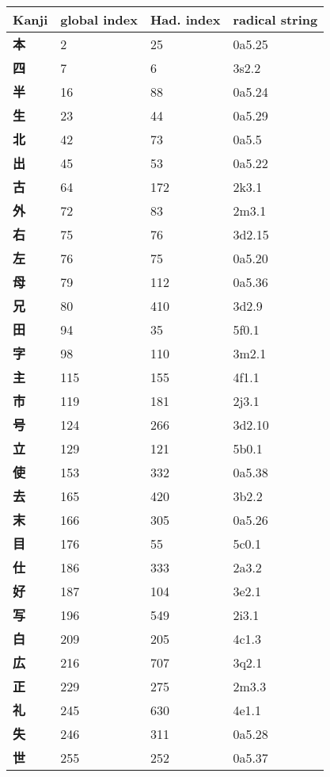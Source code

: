   \begin{longtable}[c]{llll}
    \bfseries Kanji & \bfseries global index & \bfseries Had. index & \bfseries radical string\\\hline\endhead
    \bfseries 本 & 2 & 25 & 0a5.25\\
    \bfseries 四 & 7 & 6 & 3s2.2\\
    \bfseries 半 & 16 & 88 & 0a5.24\\
    \bfseries 生 & 23 & 44 & 0a5.29\\
    \bfseries 北 & 42 & 73 & 0a5.5\\
    \bfseries 出 & 45 & 53 & 0a5.22\\
    \bfseries 古 & 64 & 172 & 2k3.1\\
    \bfseries 外 & 72 & 83 & 2m3.1\\
    \bfseries 右 & 75 & 76 & 3d2.15\\
    \bfseries 左 & 76 & 75 & 0a5.20\\
    \bfseries 母 & 79 & 112 & 0a5.36\\
    \bfseries 兄 & 80 & 410 & 3d2.9\\
    \bfseries 田 & 94 & 35 & 5f0.1\\
    \bfseries 字 & 98 & 110 & 3m2.1\\
    \bfseries 主 & 115 & 155 & 4f1.1\\
    \bfseries 市 & 119 & 181 & 2j3.1\\
    \bfseries 号 & 124 & 266 & 3d2.10\\
    \bfseries 立 & 129 & 121 & 5b0.1\\
    \bfseries 使 & 153 & 332 & 0a5.38\\
    \bfseries 去 & 165 & 420 & 3b2.2\\
    \bfseries 末 & 166 & 305 & 0a5.26\\
    \bfseries 目 & 176 & 55 & 5c0.1\\
    \bfseries 仕 & 186 & 333 & 2a3.2\\
    \bfseries 好 & 187 & 104 & 3e2.1\\
    \bfseries 写 & 196 & 549 & 2i3.1\\
    \bfseries 白 & 209 & 205 & 4c1.3\\
    \bfseries 広 & 216 & 707 & 3q2.1\\
    \bfseries 正 & 229 & 275 & 2m3.3\\
    \bfseries 礼 & 245 & 630 & 4e1.1\\
    \bfseries 失 & 246 & 311 & 0a5.28\\
    \bfseries 世 & 255 & 252 & 0a5.37\\

\end{longtable}
